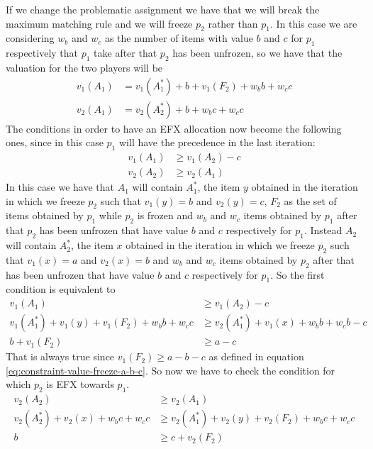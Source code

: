 If we change the problematic assignment we have that we will break the maximum matching rule and we will freeze $p_2$ rather than $p_1$. In this case we are considering $w_b$ and $w_c$ as the number of items with value $b$ and $c$ for $p_1$ respectively that $p_1$ take after that $p_2$ has been unfrozen, so we have that the valuation for the two players will be 
\begin{align*}
    v_1(A_1) &= v_1(A_1^*) + b + v_1(F_2) + w_b b + w_c c\\
    v_2(A_1) &= v_2(A_2^*) + b + w_b c + w_c c
\end{align*}
The conditions in order to have an EFX allocation now become the following ones, since in this case $p_1$ will have the precedence in the last iteration: 
\begin{align}
    v_1(A_1) &\ge v_1(A_2) - c\label{eq:condition-1-a1>a2-ch1-first-block-bb-assignment}\\
    v_2(A_2) &\ge v_2(A_1)\label{eq:condition-1-a2>a1-c-ch1-first-block-bb-assignment}
\end{align}
In this case we have that $A_1$ will contain $A_1^*$, the item $y$ obtained in the iteration in which we freeze $p_2$ such that $v_1(y) =  b$ and $v_2(y) = c$, $F_2$ as the set of items obtained by $p_1$ while $p_2$ is frozen and $w_b$ and $w_c$ items obtained by $p_1$ after that $p_2$ has been unfrozen that have value $b$ and $c$ respectively for $p_1$. Instead $A_2$ will contain $A_2^*$, the item $x$ obtained in the iteration in which we freeze $p_2$ such that $v_1(x) =  a$ and $v_2(x) = b$ and $w_b$ and $w_c$ items obtained by $p_2$ after that has been unfrozen that have value $b$ and $c$ respectively for $p_1$. So the first condition is equivalent to 
\begin{align*}
    v_1(A_1) &\ge v_1(A_2) -c\\
    v_1(A_1^*) + v_1(y) + v_1(F_2)+ w_b b + w_c c &\ge v_2(A_1^*) + v_1(x) + w_b b + w_c b - c\\
    b  + v_1(F_2)&\ge  a - c 
\end{align*}
That is always true since $ v_1(F_2) \ge  a-b-c$ as defined in equation \ref{eq:constraint-value-freeze-a-b-c}. So now we have to check the condition for which $p_2$ is EFX towards $p_1$.
\begin{align*}
    v_2(A_2) &\ge v_2(A_1)\\
    v_2(A_2^*) + v_2(x) + w_b c + w_c c &\ge  v_2(A_1^*) + v_2(y) + v_2(F_2)+ w_b c + w_c c\\
    b  &\ge  c + v_2(F_2)
\end{align*}

